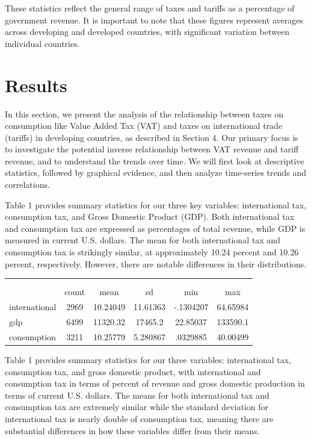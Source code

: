 \documentclass[12pt]{article}
\begin{document}
These statistics reflect the general range of taxes and tariffs as a percentage of government revenue. It is important to note that these figures represent averages across developing and developed countries, with significant variation between individual countries.

\section{Results}
\label{sec:result}

In this section, we present the analysis of the relationship between taxes on consumption like Value Added Tax (VAT) and taxes on international trade (tariffs) in developing countries, as described in Section 4. Our primary focus is to investigate the potential inverse relationship between VAT revenue and tariff revenue, and to understand the trends over time. We will first look at descriptive statistics, followed by graphical evidence, and then analyze time-series trends and correlations. 

Table 1 provides summary statistics for our three key variables: international tax, consumption tax, and Gross Domestic Product (GDP). Both international tax and consumption tax are expressed as percentages of total revenue, while GDP is measured in current U.S. dollars. The mean for both international tax and consumption tax is strikingly similar, at approximately 10.24 percent and 10.26 percent, respectively. However, there are notable differences in their distributions.

{
\def\sym#1{\ifmmode^{#1}\else\(^{#1}\)\fi}
\begin{tabular}{l*{1}{ccccc}}
            &\multicolumn{5}{c}{}                                         \\
            &\multicolumn{5}{c}{}                                            \\
            &       count&        mean&          sd&         min&         max\\
\hline
international&        2969&    10.24049&    11.61363&   -.1304207&    64.65984\\
gdp         &        6499&    11320.32&     17465.2&    22.85037&    133590.1\\
consumption &        3211&    10.25779&    5.280867&    .0329885&    40.00499\\
\hline
\end{tabular}
}

Table 1 provides summary statistics for our three variables: international tax, consumption tax, and gross domestic product, with international and consumption tax in terms of percent of revenue and gross domestic production in terms of current U.S. dollars. The means for both international tax and consumption tax are extremely similar while the standard deviation for international tax is nearly double of consumption tax, meaning there are substantial differences in how these variables differ from their means.
\end{document}
